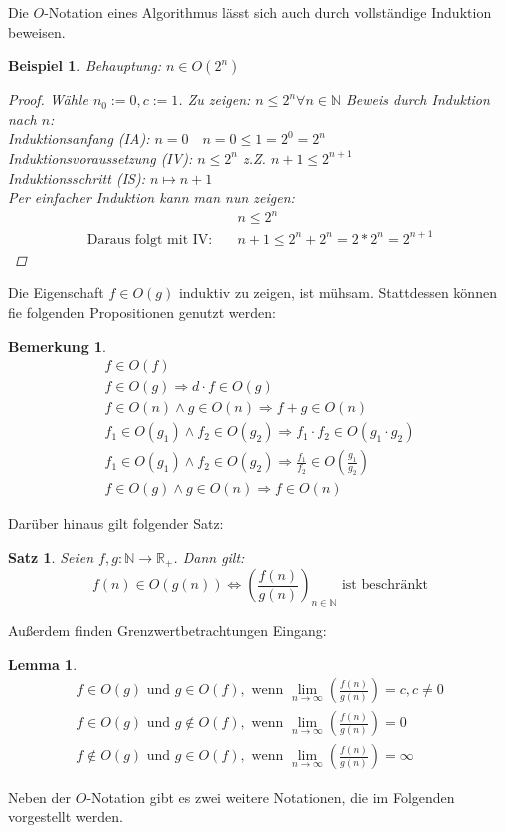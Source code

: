 \documentclass[11pt,a4paper]{scrartcl}
\newtheorem{note}{Bemerkung}
\newtheorem{satz}{Satz}
\newtheorem{lemma}{Lemma}
\newtheorem{example}{Beispiel}
\begin{document}
Die $O$-Notation eines Algorithmus lässt sich auch durch vollständige Induktion beweisen.
\begin{example}
Behauptung: $n \in O(2^{n})$
\begin{proof}
Wähle $n_{0} := 0, c:= 1$. Zu zeigen: $n \leq 2^{n} \forall n \in \mathbb{N}$
Beweis durch Induktion nach $n$: \\
Induktionsanfang (IA): $n = 0 \quad n = 0 \leq 1 = 2^{0} = 2^{n}$ \\
Induktionsvoraussetzung (IV): $n \leq 2^{n}$ z.Z. $n+1 \leq 2^{n+1}$ \\
Induktionsschritt (IS): $n \mapsto n + 1$ \\
Per einfacher Induktion kann man nun zeigen: 
\begin{align}
& n \leq 2^{n} \\
\text{Daraus folgt mit IV:} \quad & n+1 \leq 2^{n} + 2^{n} = 2*2^{n} = 2^{n+1}
\end{align}
\end{proof}
\end{example} 
Die Eigenschaft $f \in O(g)$ induktiv zu zeigen, ist mühsam. Stattdessen können fie folgenden Propositionen genutzt werden: 
\begin{note}
\begin{align}
f \in O(f) \\
f \in O(g) \Rightarrow d \cdot f \in O(g) \\
f \in O(n) \land g \in O(n) \Rightarrow f + g \in O(n) \\
f_{1} \in O(g_{1}) \land f_{2} \in O(g_{2}) \Rightarrow f_{1} \cdot f_{2} \in O(g_{1} \cdot g_{2}) \\
f_{1} \in O(g_{1}) \land f_{2} \in O(g_{2}) \Rightarrow \frac{f_{1}}{f_{2}} \in O(\frac{g_{1}}{g_{2}}) \\
f \in O(g) \land g \in O(n) \Rightarrow f \in O(n)
\end{align}
\end{note}
Darüber hinaus gilt folgender Satz: 
\begin{satz}
Seien $f, g: \mathbb{N} \to \mathbb{R_{+}}$. Dann gilt: \\
\[f(n) \in O(g(n)) \iff (\frac{f(n)}{g(n)})_{n \in \mathbb{N}} \text{ ist beschränkt}\]
\end{satz}
Außerdem finden Grenzwertbetrachtungen Eingang:
\begin{lemma}
\begin{align}
f \in O(g) \text{ und } g \in O(f), \text{ wenn } \lim \limits_{n \to \infty} (\frac{f(n)}{g(n)}) = c, c \neq 0 \\
f \in O(g) \text{ und } g \notin O(f), \text{ wenn } \lim \limits_{n \to \infty} (\frac{f(n)}{g(n)}) = 0 \\
f \notin O(g) \text{ und } g \in O(f), \text{ wenn } \lim \limits_{n \to \infty} (\frac{f(n)}{g(n)}) = \infty
\end{align}
\end{lemma}
Neben der $O$-Notation gibt es zwei weitere Notationen, die im Folgenden vorgestellt werden.
\end{document}

